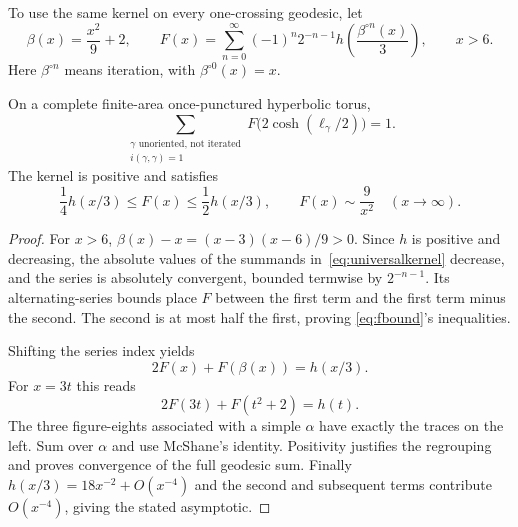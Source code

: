 To use the same kernel on every one-crossing geodesic, let
\begin{equation}
 \beta(x)=\frac{x^2}{9}+2,\qquad
 F(x)=\sum_{n=0}^{\infty}(-1)^n2^{-n-1}
             h\left(\frac{\beta^{\circ n}(x)}3\right),\qquad x>6.
 \label{eq:universalkernel}
\end{equation}
Here $\beta^{\circ n}$ means iteration, with $\beta^{\circ0}(x)=x$.

\begin{proposition}
On a complete finite-area once-punctured hyperbolic torus,
\begin{equation}
 \boxed{\sum_{\substack{\gamma\text{ unoriented, not iterated}\\
                       i(\gamma,\gamma)=1}}
        F\bigl(2\cosh(\ell_\gamma/2)\bigr)=1.}
 \label{eq:allfigureidentity}
\end{equation}
The kernel is positive and satisfies
\begin{equation}
 \frac14h(x/3)\le F(x)\le\frac12h(x/3),
 \qquad F(x)\sim\frac9{x^2}\quad(x\longrightarrow\infty).
 \label{eq:fbound}
\end{equation}
\end{proposition}

\begin{proof}
For $x>6$,
$\beta(x)-x=(x-3)(x-6)/9>0$. Since $h$ is positive and decreasing,
the absolute values of the summands in~\eqref{eq:universalkernel} decrease,
and the series is absolutely convergent, bounded termwise by $2^{-n-1}$.
Its alternating-series bounds place $F$ between the first term and the
first term minus the second. The second is at most half the first, proving
\eqref{eq:fbound}'s inequalities.

Shifting the series index yields
\[
 2F(x)+F(\beta(x))=h(x/3).
\]
For $x=3t$ this reads
\begin{equation}
 2F(3t)+F(t^2+2)=h(t).
 \label{eq:kernelrelation}
\end{equation}
The three figure-eights associated with a simple $\alpha$ have exactly
the traces on the left. Sum over $\alpha$ and use McShane's identity.
Positivity justifies the regrouping and proves convergence of the full
geodesic sum. Finally $h(x/3)=18x^{-2}+O(x^{-4})$ and the second and
subsequent terms contribute $O(x^{-4})$, giving the stated asymptotic.
\end{proof}

